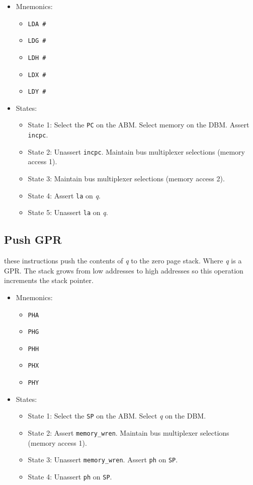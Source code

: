 \documentclass[a4paper,12pt]{article}
\newcommand{\SP}{\texttt{SP}}
\newcommand{\PC}{\texttt{PC}}
\newcommand{\qq}{\textit{q}}
\begin{document}
\begin{itemize}
\item Mnemonics:
\begin{itemize}
	\item \texttt{LDA \#}
	\item \texttt{LDG \#}
	\item \texttt{LDH \#}
	\item \texttt{LDX \#}
	\item \texttt{LDY \#}
\end{itemize}
\item States:
\begin{itemize}
	\item State 1: Select the \PC{} on the ABM. Select memory on the DBM.
	Assert \texttt{incpc}.
	\item State 2: Unassert \texttt{incpc}. Maintain bus multiplexer
	selections (memory access 1).
	\item State 3: Maintain bus multiplexer selections (memory access 2).
	\item State 4: Assert \texttt{la} on \qq{}.
	\item State 5: Unassert \texttt{la} on \qq{}.
\end{itemize}
\end{itemize}

\subsection{Push GPR}
these instructions push the contents of \qq{} to the zero page stack. Where
\qq{} is a GPR. The stack grows from low addresses to high addresses so this
operation increments the stack pointer.
\par

\begin{itemize}
\item Mnemonics:
\begin{itemize}
	\item \texttt{PHA}
	\item \texttt{PHG}
	\item \texttt{PHH}
	\item \texttt{PHX}
	\item \texttt{PHY}
\end{itemize}
\item States:
\begin{itemize}
	\item State 1: Select the \SP{} on the ABM. Select \qq{} on the DBM.
	\item State 2: Assert \texttt{memory\_wren}. Maintain bus multiplexer
	selections (memory access 1).
	\item State 3: Unassert \texttt{memory\_wren}. Assert \texttt{ph} on 
	\SP{}. 
	\item State 4: Unassert \texttt{ph} on \SP{}.
\end{itemize}
\end{itemize}
\end{document}
